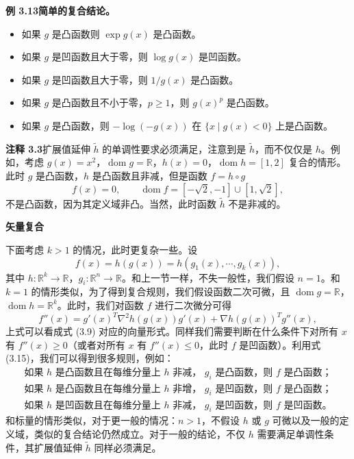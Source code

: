 \documentclass[UTF8,12pt,a4paper,fontset=fandol]{ctexart}
\DeclareMathOperator{\dom}{dom}
\begin{document}
\noindent\textbf{例 3.13\quad 简单的复合结论。}
\begin{itemize}
\item 如果 $g$ 是凸函数则 $\exp g(x)$ 是凸函数。
\item 如果 $g$ 是凹函数且大于零，则 $\log g(x)$ 是凹函数。
\item 如果 $g$ 是凹函数且大于零，则 $1/g(x)$ 是凸函数。
\item 如果 $g$ 是凸函数且不小于零，$p\geq1$，则 $g(x)^p$ 是凸函数。
\item 如果 $g$ 是凸函数，则 $-\log(-g(x))$ 在 $\{x\mid g(x)<0\}$ 上是凸函数。
\end{itemize}

\noindent\textbf{注释 3.3}\quad 扩展值延伸 $\tilde h$ 的单调性要求必须满足，注意到是 $\tilde h$，而不仅仅是 $h$。例如，考虑 $g(x)=x^2$，$\dom g=\mathbb{R}$，$h(x)=0$，$\dom h=[1,2]$ 复合的情形。此时 $g$ 是凸函数，$h$ 是凸函数且非减，但是函数 $f=h\circ g$
\[
f(x)=0,\qquad \dom f=[-\sqrt{2},-1]\cup[1,\sqrt{2}],
\]
不是凸函数，因为其定义域非凸。当然，此时函数 $\tilde h$ 不是非减的。

\noindent\textbf{矢量复合}

下面考虑 $k>1$ 的情况，此时更复杂一些。设
\[
f(x)=h(g(x))=h(g_1(x),\cdots,g_k(x)),
\]
其中 $h:\mathbb{R}^k\to\mathbb{R}$，$g_i:\mathbb{R}^n\to\mathbb{R}$。和上一节一样，不失一般性，我们假设 $n=1$。和 $k=1$ 的情形类似，为了得到复合规则，我们假设函数二次可微，且 $\dom g=\mathbb{R}$，$\dom h=\mathbb{R}^k$。此时，我们对函数 $f$ 进行二次微分可得
\begin{equation}
f''(x)=g'(x)^T\nabla^2 h(g(x))g'(x)+\nabla h(g(x))^Tg''(x),
\tag{3.15}
\end{equation}
上式可以看成式 (3.9) 对应的向量形式。同样我们需要判断在什么条件下对所有 $x$ 有 $f''(x)\geq0$（或者对所有 $x$ 有 $f''(x)\leq0$，此时 $f$ 是凹函数）。利用式 (3.15)，我们可以得到很多规则，例如：
\[
\begin{array}{ll}
\text{如果 }h\text{ 是凸函数且在每维分量上 }h\text{ 非减， }g_i\text{ 是凸函数，则 }f\text{ 是凸函数；}\\
\text{如果 }h\text{ 是凸函数且在每维分量上 }h\text{ 非增， }g_i\text{ 是凹函数，则 }f\text{ 是凸函数；}\\
\text{如果 }h\text{ 是凹函数且在每维分量上 }h\text{ 非减， }g_i\text{ 是凹函数，则 }f\text{ 是凹函数。}
\end{array}
\]
和标量的情形类似，对于更一般的情况：$n>1$，不假设 $h$ 或 $g$ 可微以及一般的定义域，类似的复合结论仍然成立。对于一般的结论，不仅 $h$ 需要满足单调性条件，其扩展值延伸 $\tilde h$ 同样必须满足。
\end{document}
